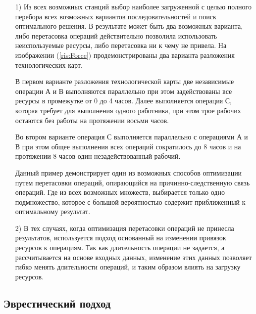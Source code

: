 \begin{itemize}
    \item[1)] Из всех возможных станций выбор наиболее загруженной с целью полного перебора всех возможных вариантов последовательностей и поиск оптимального решения. В результате может быть два возможных варианта, либо перетасовка операций действительно позволила использовать неиспользуемые ресурсы, либо перетасовка ни к чему не привела. На изображении (\ref{ris:Force}) продемонстрированы два варианта разложения технологических карт. 
    
    В первом варианте разложения технологической карты две независимые операции А и В выполняются параллельно при этом задействованы все ресурсы в промежутке от 0 до 4 часов. Далее выполняется операция С, которая требует для выполнения одного работника, при этом трое рабочих остаются без работы на протяжении восьми часов.
    
    Во втором варианте операция С выполняется параллельно с операциями А и В при этом общее выполнения всех операций сократилось до 8 часов и на протяжении 8 часов один незадействованный рабочий.
    
    Данный пример демонстрирует один из возможных способов оптимизации путем перетасовки операций, опирающийся на причинно-следственную связь операций.  Где из всех возможных множеств, выбирается только одно подмножество, которое с большой вероятностью содержит приближенный к оптимальному результат.
    
    \item[2)] В тех случаях, когда оптимизация перетасовки операций не принесла результатов, используется подход основанный на изменении привязок ресурсов к операциям. Так как длительность операции не задается, а рассчитывается на основе входных данных, изменение этих данных позволяет гибко менять длительности операций, и таким образом влиять на загрузку ресурсов. 

\end{itemize}


\subsection{Эврестический подход}

